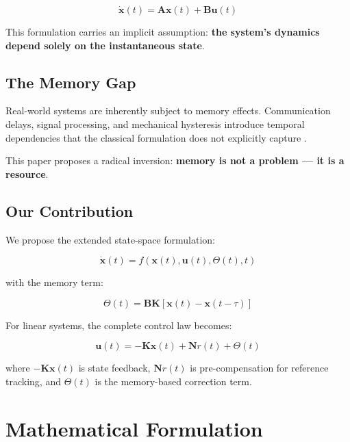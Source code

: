 \documentclass[12pt,a4paper]{article}
\begin{document}
\begin{equation}
\dot{\mathbf{x}}(t) = \mathbf{A}\mathbf{x}(t) + \mathbf{B}\mathbf{u}(t)
\label{eq:classical}
\end{equation}

This formulation carries an implicit assumption: \textbf{the 
system's dynamics depend solely on the instantaneous state}.

\subsection{The Memory Gap}

Real-world systems are inherently subject to memory effects. 
Communication delays, signal processing, and mechanical hysteresis 
introduce temporal dependencies that the classical formulation 
does not explicitly capture \citep{Richard2003, Niculescu2001}.

This paper proposes a radical inversion: \textbf{memory is not a 
problem — it is a resource}.

\subsection{Our Contribution}

We propose the extended state-space formulation:

\begin{equation}
\boxed{\dot{\mathbf{x}}(t) = f\left(\mathbf{x}(t), \mathbf{u}(t), \Theta(t), t\right)}
\label{eq:proposed}
\end{equation}

with the memory term:

\begin{equation}
\Theta(t) = \mathbf{BK}\left[\mathbf{x}(t) - \mathbf{x}(t-\tau)\right]
\label{eq:theta}
\end{equation}

For linear systems, the complete control law becomes:

\begin{equation}
\mathbf{u}(t) = -\mathbf{K}\mathbf{x}(t) + \mathbf{N}r(t) + \Theta(t)
\label{eq:control_law}
\end{equation}

where $-\mathbf{K}\mathbf{x}(t)$ is state feedback, $\mathbf{N}r(t)$ 
is pre-compensation for reference tracking, and $\Theta(t)$ is the 
memory-based correction term.

\section{Mathematical Formulation}
\end{document}
